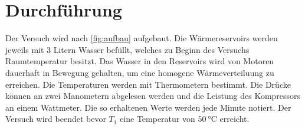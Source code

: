 \section{Durchführung}
\label{sec:Durchführung}
Der Versuch wird nach \ref{fig:aufbau} aufgebaut.
Die Wärmereservoirs werden jeweils mit 3 Litern Wasser befüllt, welches zu Beginn des Versuchs Raumtemperatur besitzt.
Das Wasser in den Reservoirs wird von Motoren dauerhaft in Bewegung gehalten, um eine homogene Wärmeverteiluung zu erreichen.
Die Temperaturen werden mit Thermometern bestimmt.
Die Drücke können an zwei Manometern abgelesen werden und die Leistung des Kompressors an einem Wattmeter.
Die so erhaltenen Werte werden jede Minute notiert.
Der Versuch wird beendet bevor $T_1$ eine Temperatur von $\SI{50}{\celsius}$ erreicht.

